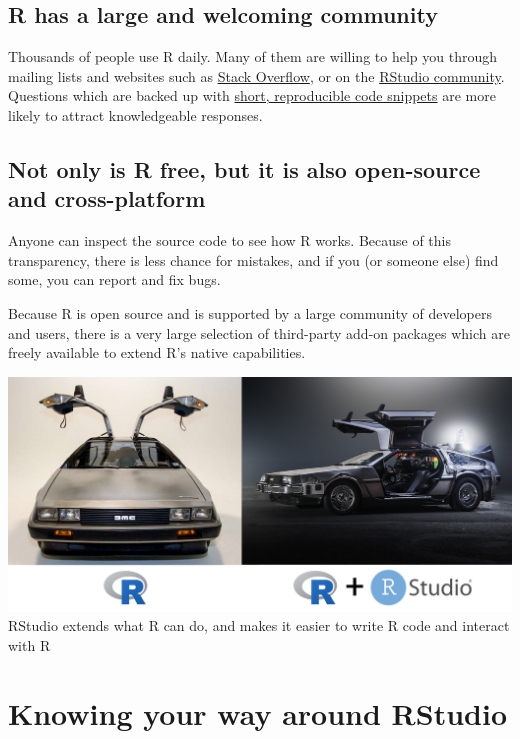 \documentclass[]{book}
\begin{document}
\subsection{R has a large and welcoming
community}\label{r-has-a-large-and-welcoming-community}

Thousands of people use R daily. Many of them are willing to help you
through mailing lists and websites such as
\href{https://stackoverflow.com/}{Stack Overflow}, or on the
\href{https://community.rstudio.com/}{RStudio community}. Questions
which are backed up with \href{https://www.tidyverse.org/help/}{short,
reproducible code snippets} are more likely to attract knowledgeable
responses.

\subsection{Not only is R free, but it is also open-source and
cross-platform}\label{not-only-is-r-free-but-it-is-also-open-source-and-cross-platform}

Anyone can inspect the source code to see how R works. Because of this
transparency, there is less chance for mistakes, and if you (or someone
else) find some, you can report and fix bugs.

Because R is open source and is supported by a large community of
developers and users, there is a very large selection of third-party
add-on packages which are freely available to extend R's native
capabilities.

\includegraphics{./fig/r+rstudio-analogy.jpg} RStudio extends what R can
do, and makes it easier to write R code and interact with R

\section{Knowing your way around
RStudio}\label{knowing-your-way-around-rstudio}
\end{document}
